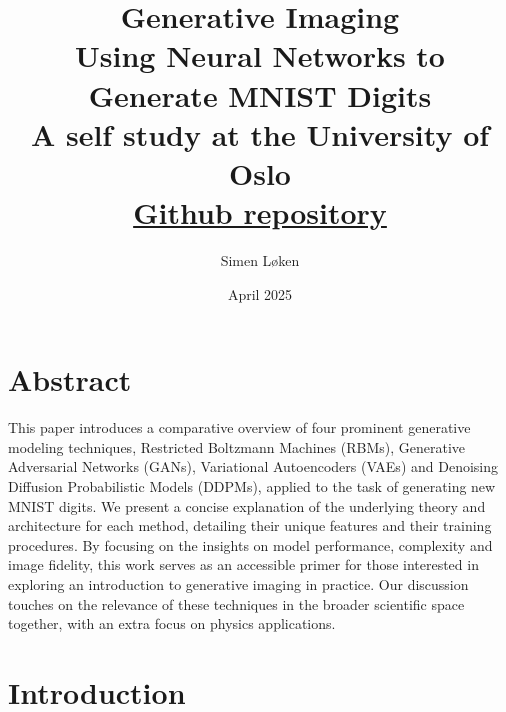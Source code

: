 \documentclass{article}
\title{Generative Imaging \\
\Large Using Neural Networks to Generate MNIST Digits \\
\small A self study at the University of Oslo \\
\small \href{https://github.com/simloken/Generative_Imaging}{Github repository}}
\author{Simen Løken}
\date{April 2025}
\begin{document}
\maketitle

\newpage
{
  \hypersetup{linkcolor=black}
  \tableofcontents
}
\newpage
\section{Abstract}
This paper introduces a comparative overview of four prominent generative modeling techniques, Restricted Boltzmann Machines (RBMs), Generative Adversarial Networks (GANs), Variational Autoencoders (VAEs) and Denoising Diffusion Probabilistic Models (DDPMs), applied to the task of generating new MNIST digits. We present a concise explanation of the underlying theory and architecture for each method, detailing their unique features and their training procedures. By focusing on the insights on model performance, complexity and image fidelity, this work serves as an accessible primer for those interested in exploring an introduction to generative imaging in practice. Our discussion touches on the relevance of these techniques in the broader scientific space together, with an extra focus on physics applications.
\nocite{foster2019generative}
\nocite{tomczak2022deep}
\nocite{goodfellow2014generativeadversarialnetworks}
\nocite{kingma2022autoencodingvariationalbayes}
\nocite{ho2020denoisingdiffusionprobabilisticmodels}

\newpage
\section{Introduction}
\end{document}
